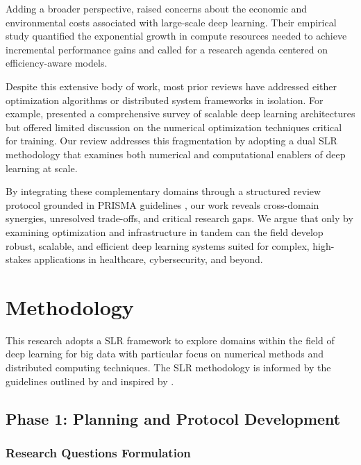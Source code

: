 \documentclass[acmsmall]{acmart}
\begin{document}
Adding a broader perspective, \citet{thompson2020computational} raised concerns about the economic and environmental costs associated with large-scale deep learning. Their empirical study quantified the exponential growth in compute resources needed to achieve incremental performance gains and called for a research agenda centered on efficiency-aware models.

Despite this extensive body of work, most prior reviews have addressed either optimization algorithms or distributed system frameworks in isolation. For example, \citet{li2020survey} presented a comprehensive survey of scalable deep learning architectures but offered limited discussion on the numerical optimization techniques critical for training. Our review addresses this fragmentation by adopting a dual SLR methodology that examines both numerical and computational enablers of deep learning at scale.

By integrating these complementary domains through a structured review protocol grounded in PRISMA guidelines \citep{moher2009preferred},
our work reveals cross-domain synergies, unresolved trade-offs, and critical research gaps. We argue that only by examining optimization and infrastructure in tandem can
the field develop robust, scalable, and efficient deep learning systems suited for complex, high-stakes applications in healthcare, cybersecurity, and beyond.

\section{Methodology}\label{sec:methodology}
This research adopts a SLR framework to explore domains within the field of deep learning for big data with particular focus on numerical methods and distributed computing techniques. The SLR methodology is informed by the guidelines outlined by \citet{kitchenham2004procedures} and inspired by \citet{ataei2022state}.

\subsection{Phase 1: Planning and Protocol Development}\label{subsec:phase-1-planning-and-protocol-development}

\subsubsection{Research Questions Formulation}\label{subsubsec:phase-1-planning-and-protocol-development:research-questions-formulation}
\end{document}
